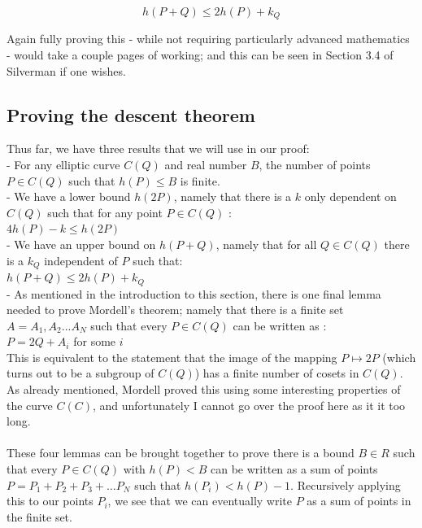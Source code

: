 \documentclass{article}
\begin{document}
\[h(P + Q) \leq 2h(P) + k_Q\]

Again fully proving this - while not requiring particularly advanced mathematics - would take a couple pages of working; and this can be seen in Section 3.4 of Silverman if one wishes.

\subsection{Proving the descent theorem}

Thus far, we have three results that we will use in our proof:\\

- For any elliptic curve $C(Q)$ and  real number $B$, the number of points $P \in C(Q)$ such that $h(P) \leq B$ is finite.\\

- We have a lower bound $h(2P)$, namely that there is a $k$ only dependent on $C(Q)$ such that for any point $P \in C(Q)$ : \\

$4h(P) - k \leq h(2P) $\\

- We have an upper bound on $h(P + Q)$, namely that for all $Q \in C(Q)$ there is a $k_Q$ independent of $P$ such that:\\

$h(P + Q) \leq 2h(P) + k_Q$\\

- As mentioned in the introduction to this section, there is one final lemma needed to prove Mordell's theorem; namely that there is a finite set $A = {A_1, A_2 ... A_N}$ such that every $P \in C(Q)$ can be written as :\\

$P = 2Q + A_i$ for some $i$\\

This is equivalent to the statement that the image of the mapping $P \mapsto 2P$ (which turns out to be a subgroup of $C(Q)$) has a finite number of cosets in $C(Q)$. As already mentioned, Mordell proved this using some interesting properties of the curve $C(C)$, and unfortunately I cannot go over the proof here as it it too long.\\
 \\
These four lemmas can be brought together to prove there is a bound $B \in R$ such that every $P \in C(Q)$ with $h(P) < B$ can be written as a sum of points $P = P_1 + P_2 + P_3 + \dots P_N$ such that $h(P_i) < h(P) - 1$. Recursively applying this to our points $P_i$, we see that we can eventually write $P$ as a sum of points in the finite set.\\
\end{document}
